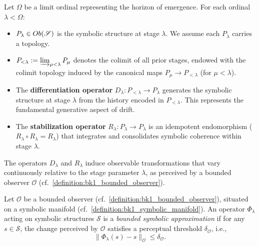 \begin{definition}
\label{definition:bk1_pre_geometric_operators_and_stages}
Let $\Omega$ be a limit ordinal representing the horizon of emergence. For each ordinal $\lambda < \Omega$:
\begin{itemize}
    \item $P_\lambda \in Ob(\mathscr{S})$ is the symbolic structure at stage $\lambda$. We assume each $P_\lambda$ carries a topology.
    \item $P_{<\lambda} := \varinjlim_{\mu < \lambda} P_\mu$ denotes the colimit of all prior stages, endowed with the colimit topology induced by the canonical maps $P_\mu \to P_{<\lambda}$ (for $\mu < \lambda$).
    \item The \textbf{differentiation operator} $D_\lambda: P_{<\lambda} \to P_\lambda$ generates the symbolic structure at stage $\lambda$ from the history encoded in $P_{<\lambda}$. This represents the fundamental generative aspect of drift.
    \item The \textbf{stabilization operator} $R_\lambda: P_\lambda \to P_\lambda$ is an idempotent endomorphism ($R_\lambda \circ R_\lambda = R_\lambda$) that integrates and consolidates symbolic coherence within stage $\lambda$.
\end{itemize}
\end{definition}
\begin{axiom}
\label{axiom:bk1_observable_gradation_of_pre_geometric_operations}
The operators $D_\lambda$ and $R_\lambda$ induce observable transformations that vary continuously relative to the stage parameter $\lambda$, as perceived by a bounded observer $\mathcal{O}$ (cf.~\ref{definition:bk1_bounded_observer}).
\end{axiom}

\begin{definition}
\label{definition:bk1_bounded_symbolic_approximation_process}
Let $\mathcal{O}$ be a bounded observer (cf.~\ref{definition:bk1_bounded_observer}), situated on a symbolic manifold (cf.~\ref{definition:bk1_symbolic_manifold}). An operator $\Phi_\lambda$ acting on symbolic structures $\mathcal{S}$ is a \emph{bounded symbolic approximation} if for any $s \in \mathcal{S}$, the change perceived by $\mathcal{O}$ satisfies a perceptual threshold $\delta_\mathcal{O}$, i.e.,
\[
\|\Phi_\lambda(s) - s\|_\mathcal{O} \leq \delta_\mathcal{O}.
\]
\end{definition}

